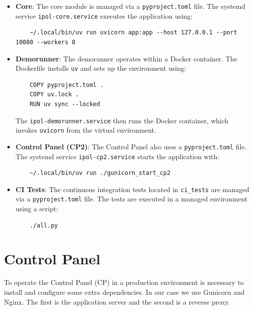 \documentclass[a4paper,12pt]{article}
\begin{document}
\begin{itemize}
    \item \textbf{Core}: The core module is managed via a \texttt{pyproject.toml} file. The systemd service \texttt{ipol-core.service} executes the application using:
    \begin{verbatim}
    ~/.local/bin/uv run uvicorn app:app --host 127.0.0.1 --port 10080 --workers 8
    \end{verbatim}

    \item \textbf{Demorunner}: The demorunner operates within a Docker container. The Dockerfile installs \texttt{uv} and sets up the environment using:
    \begin{verbatim}
    COPY pyproject.toml .
    COPY uv.lock .
    RUN uv sync --locked
    \end{verbatim}
    The \texttt{ipol-demorunner.service} then runs the Docker container, which invokes \texttt{uvicorn} from the virtual environment.

    \item \textbf{Control Panel (CP2)}: The Control Panel also uses a \texttt{pyproject.toml} file. The systemd service \texttt{ipol-cp2.service} starts the application with:
    \begin{verbatim}
    ~/.local/bin/uv run ./gunicorn_start_cp2
    \end{verbatim}

    \item \textbf{CI Tests}: The continuous integration tests located in \texttt{ci\_tests} are managed via a \texttt{pyproject.toml} file. The tests are executed in a managed environment using a script:
    \begin{verbatim}
    ./all.py
    \end{verbatim}
\end{itemize}

\section{Control Panel}
To operate the Control Panel (CP) in a production environment is necessary to install and configure some extra dependencies. In our case we use Gunicorn and Nginx. The first is the application server and the second is a reverse proxy.
\end{document}
